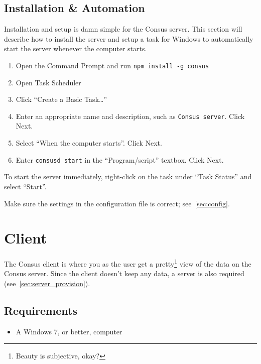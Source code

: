 \subsection{Installation \& Automation}
\label{subsec:server_install}

Installation and setup is damn simple for the Consus server.
This section will describe how to install the server and setup a task for Windows to automatically start the server whenever the computer starts.

\begin{enumerate}
  \item Open the Command Prompt and run \texttt{npm install -g consus}
  \item Open Task Scheduler
  \item Click ``Create a Basic Task\ldots''
  \item Enter an appropriate name and description, such as \texttt{Consus server}. Click Next.
  \item Select ``When the computer starts''. Click Next.
  \item Enter \texttt{consusd start} in the ``Program/script'' textbox. Click Next.
\end{enumerate}

To start the server immediately, right-click on the task under ``Task Status'' and select ``Start''.

Make sure the settings in the configuration file is correct; see~\autoref{sec:config}.

\section{Client}
\label{sec:client_provision}

The Consus client is where you as the user get a pretty\footnote{Beauty is subjective, okay?} view of the data on the Consus server.
Since the client doesn't keep any data, a server is also required (see~\autoref{sec:server_provision}).

\subsection{Requirements}
\label{subsec:client_reqa}

\begin{itemize}
  \item A Windows 7, or better, computer
\end{itemize}

